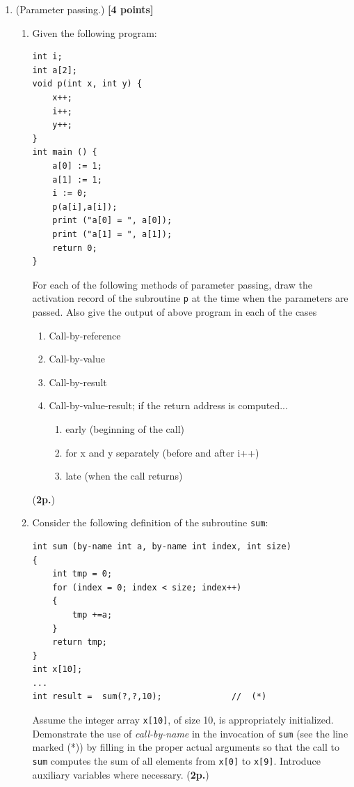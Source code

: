 \documentclass{article}
\begin{document}
\begin{enumerate}
\item (Parameter passing.) 
\hfill{\textbf{[4 points]}}
\begin{enumerate}
\item Given  the following program:

{\small
\begin{verbatim}
int i;
int a[2];
void p(int x, int y) {
    x++;
    i++;
    y++;
}
int main () {
    a[0] := 1;
    a[1] := 1;
    i := 0;
    p(a[i],a[i]);
    print ("a[0] = ", a[0]);
    print ("a[1] = ", a[1]);
    return 0;
}
\end{verbatim}
}

For each of the following methods of parameter passing,
draw the activation record of the subroutine \texttt{p} at the time when
the parameters are passed. Also give the output of above program
in each of the cases

\begin{enumerate}\itemsep=0.0cm
\item Call-by-reference
\item Call-by-value
\item Call-by-result
\item Call-by-value-result; if the return address is computed...
\begin{enumerate}\itemsep=0.0cm
\item early (beginning of the call)
\item for x and y separately (before and after i++)
\item late (when the call returns)
\end{enumerate}
\end{enumerate}
 (\textbf{2p.})
\item Consider the following definition of the 
subroutine \texttt{sum}: 

{\small 
\begin{verbatim}
int sum (by-name int a, by-name int index, int size)
{
    int tmp = 0;
    for (index = 0; index < size; index++)
    {
        tmp +=a;
    }
    return tmp;
}
int x[10];
...
int result =  sum(?,?,10);              //  (*)   
\end{verbatim}
}
 Assume the integer array \texttt{x[10]}, of size 10, is appropriately
initialized. Demonstrate the use of \textit{call-by-name} in the invocation of
\texttt{sum} (see the line marked (*)) by filling in the
proper actual arguments so that the call to \texttt{sum} computes
the sum of all elements from \texttt{x[0]} to \texttt{x[9]}. 
Introduce auxiliary variables where necessary. (\textbf{2p.})
\\
\end{enumerate} 


\end{enumerate}
\end{document}
